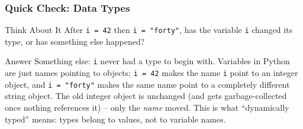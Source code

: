 \begin{frame}[fragile]\frametitle{Quick Check: Data Types}
\begin{block}{Think About It}
After \texttt{i = 42} then \texttt{i = "forty"}, has the variable \texttt{i} changed its type, or has something else happened?
\end{block}
\pause
\begin{block}{Answer}
Something else: \texttt{i} never had a type to begin with. Variables in Python are just names pointing to objects; \texttt{i = 42} makes the name \texttt{i} point to an integer object, and \texttt{i = "forty"} makes the same name point to a completely different string object. The old integer object is unchanged (and gets garbage-collected once nothing references it) -- only the \emph{name} moved. This is what ``dynamically typed'' means: types belong to values, not to variable names.
\end{block}
\end{frame}

%


